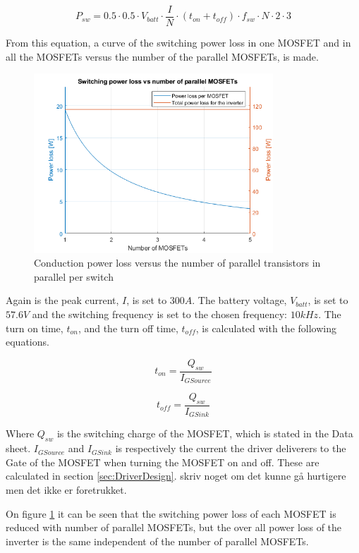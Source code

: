     \begin{equation}
        P_{sw} = 0.5 \cdot 0.5 \cdot V_{batt} \cdot \frac{I}{N} \cdot (t_{on}+t_{off}) \cdot f_{sw} \cdot N \cdot 2 \cdot 3
        \label{eq:sw_loss}
    \end{equation}
    
From this equation, a curve of the switching power loss in one MOSFET and in all the MOSFETs versus the number of the parallel MOSFETs, is made.

    \begin{figure}[H]
		\centering
		\includegraphics[width=0.8\textwidth]{pictures/hardware/Power_Board/Switch_loss.png}
		\caption{Conduction power loss versus the number of parallel transistors in parallel per switch}
		\label{fig:sw_loss}
	\end{figure}
	
Again is the peak current, $I$, is set to $300 A$. The battery voltage, $V_{batt}$, is set to $57.6 V$ and the switching frequency is set to the chosen frequency: $10 kHz$. The turn on time, $t_{on}$, and the turn off time, $t_{off}$, is calculated with the following equations.

    \begin{equation}
        t_{on} = \frac{Q_{sw}}{I_{GSource}}
    \end{equation}
    
    \begin{equation}
        t_{off} = \frac{Q_{sw}}{I_{GSink}}
    \end{equation}
    
Where $Q_{sw}$ is the switching charge of the MOSFET, which is stated in the Data sheet. 
$I_{GSource}$ and $I_{GSink}$ is respectively the current the driver deliverers to the Gate of the MOSFET when turning the MOSFET on and off. These are calculated in section \ref{sec:DriverDesign}. skriv noget om det kunne gå hurtigere men det ikke er foretrukket.

On figure \ref{fig:sw_loss} it can be seen that the switching power loss of each MOSFET is reduced with number of parallel MOSFETs, but the over all power loss of the inverter is the same independent of the number of parallel MOSFETs.